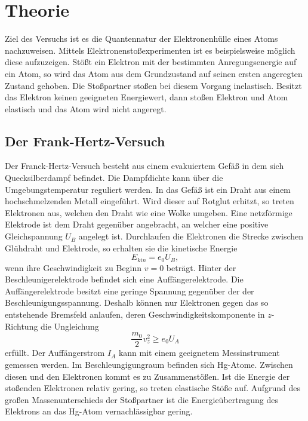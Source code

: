 \section{Theorie}
\label{sec:Theorie}
Ziel des Versuchs ist es die Quantennatur der Elektronenhülle eines Atoms nachzuweisen.
Mittels Elektronenstoßexperimenten ist es beispielsweise möglich diese aufzuzeigen.
Stößt ein Elektron mit der bestimmten Anregungsenergie auf ein Atom, so wird das Atom aus dem Grundzustand auf seinen ersten angeregten Zustand gehoben.
Die Stoßpartner stoßen bei diesem Vorgang inelastisch.
Besitzt das Elektron keinen geeigneten Energiewert, dann stoßen Elektron und Atom elastisch und das Atom wird nicht angeregt.

\subsection{Der Frank-Hertz-Versuch}
Der Franck-Hertz-Versuch besteht aus einem evakuiertem Gefäß in dem sich Quecksilberdampf befindet.
Die Dampfdichte kann über die Umgebungstemperatur reguliert werden.
In das Gefäß ist ein Draht aus einem hochschmelzenden Metall eingeführt.
Wird dieser auf Rotglut erhitzt, so treten Elektronen aus, welchen den Draht wie eine Wolke umgeben.
Eine netzförmige Elektrode ist dem Draht gegenüber angebracht, an welcher eine positive Gleichspannung $U_B$ angelegt ist.
Durchlaufen die Elektronen die Strecke zwischen Glühdraht und Elektrode, so erhalten sie die kinetische Energie
\begin{equation}
  \label{eq:ekin}
  E_{kin} = e_0 U_B  ,
\end{equation}
wenn ihre Geschwindigkeit zu Beginn $v= 0$ beträgt.
Hinter der Beschleunigerelektrode befindet sich eine Auffängerelektrode.
Die Auffängerelektrode besitzt eine geringe Spannung gegenüber der der Beschleunigungsspannung.
Deshalb können nur Elektronen gegen das so entstehende Bremsfeld anlaufen, deren Geschwindigkeitskomponente in $z$-Richtung die Ungleichung
\begin{equation}
  \label{eq:ungl}
  \frac{m_0}{2}v_z^2 \geq e_0 U_A
\end{equation}
erfüllt.
Der Auffängerstrom $I_A$ kann mit einem geeignetem Messinstrument gemessen werden.
Im Beschleungigungraum befinden sich Hg-Atome.
Zwischen diesen und den Elektronen kommt es zu Zusammenstößen.
Ist die Energie der stoßenden Elektronen relativ gering, so treten elastische Stöße auf.
Aufgrund des großen Massenunterschieds der Stoßpartner ist die Energieübertragung des Elektrons an das Hg-Atom vernachlässigbar gering.
